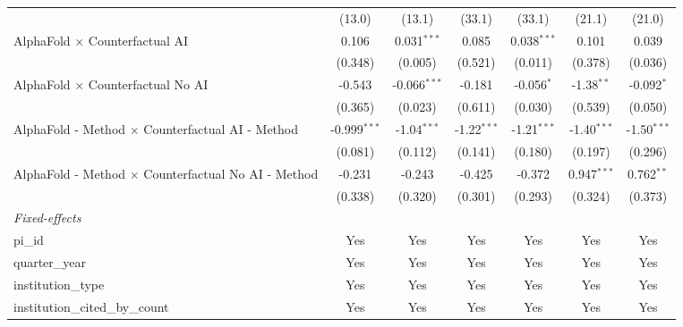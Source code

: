 \begin{tabular}{lcccccc}
                                                               & (13.0)         & (13.1)         & (33.1)        & (33.1)        & (21.1)        & (21.0)\\   
   AlphaFold $\times$ Counterfactual AI                        & 0.106          & 0.031$^{***}$  & 0.085         & 0.038$^{***}$ & 0.101         & 0.039\\   
                                                               & (0.348)        & (0.005)        & (0.521)       & (0.011)       & (0.378)       & (0.036)\\   
   AlphaFold $\times$ Counterfactual No AI                     & -0.543         & -0.066$^{***}$ & -0.181        & -0.056$^{*}$  & -1.38$^{**}$  & -0.092$^{*}$\\   
                                                               & (0.365)        & (0.023)        & (0.611)       & (0.030)       & (0.539)       & (0.050)\\   
   AlphaFold - Method $\times$ Counterfactual AI - Method      & -0.999$^{***}$ & -1.04$^{***}$  & -1.22$^{***}$ & -1.21$^{***}$ & -1.40$^{***}$ & -1.50$^{***}$\\   
                                                               & (0.081)        & (0.112)        & (0.141)       & (0.180)       & (0.197)       & (0.296)\\   
   AlphaFold - Method $\times$ Counterfactual No AI - Method   & -0.231         & -0.243         & -0.425        & -0.372        & 0.947$^{***}$ & 0.762$^{**}$\\   
                                                               & (0.338)        & (0.320)        & (0.301)       & (0.293)       & (0.324)       & (0.373)\\   
   \midrule
   \emph{Fixed-effects}\\
   pi\_id                                                      & Yes            & Yes            & Yes           & Yes           & Yes           & Yes\\  
   quarter\_year                                               & Yes            & Yes            & Yes           & Yes           & Yes           & Yes\\  
   institution\_type                                           & Yes            & Yes            & Yes           & Yes           & Yes           & Yes\\  
   institution\_cited\_by\_count                               & Yes            & Yes            & Yes           & Yes           & Yes           & Yes\\  

\end{tabular}
